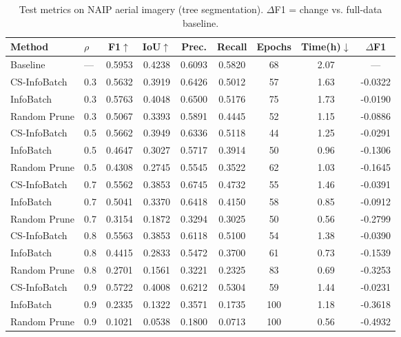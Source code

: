 \begin{table}[ht]
\centering
\small
\caption{Test metrics on NAIP aerial imagery (tree segmentation). $\Delta$F1 = change vs. full-data baseline.}
\label{tab:main_results}
\begin{tabular}{llccccccc}
\toprule
Method & $\rho$ & F1$\uparrow$ & IoU$\uparrow$ & Prec. & Recall & Epochs & Time(h)$\downarrow$ & $\Delta$F1 \\
\midrule
Baseline & --- & 0.5953 & 0.4238 & 0.6093 & 0.5820 & 68 & 2.07 & --- \\
\midrule
CS-InfoBatch & 0.3 & 0.5632 & 0.3919 & 0.6426 & 0.5012 & 57 & 1.63 & -0.0322 \\
InfoBatch & 0.3 & 0.5763 & 0.4048 & 0.6500 & 0.5176 & 75 & 1.73 & -0.0190 \\
Random Prune & 0.3 & 0.5067 & 0.3393 & 0.5891 & 0.4445 & 52 & 1.15 & -0.0886 \\
\midrule
CS-InfoBatch & 0.5 & 0.5662 & 0.3949 & 0.6336 & 0.5118 & 44 & 1.25 & -0.0291 \\
InfoBatch & 0.5 & 0.4647 & 0.3027 & 0.5717 & 0.3914 & 50 & 0.96 & -0.1306 \\
Random Prune & 0.5 & 0.4308 & 0.2745 & 0.5545 & 0.3522 & 62 & 1.03 & -0.1645 \\
\midrule
CS-InfoBatch & 0.7 & 0.5562 & 0.3853 & 0.6745 & 0.4732 & 55 & 1.46 & -0.0391 \\
InfoBatch & 0.7 & 0.5041 & 0.3370 & 0.6418 & 0.4150 & 58 & 0.85 & -0.0912 \\
Random Prune & 0.7 & 0.3154 & 0.1872 & 0.3294 & 0.3025 & 50 & 0.56 & -0.2799 \\
\midrule
CS-InfoBatch & 0.8 & 0.5563 & 0.3853 & 0.6118 & 0.5100 & 54 & 1.38 & -0.0390 \\
InfoBatch & 0.8 & 0.4415 & 0.2833 & 0.5472 & 0.3700 & 61 & 0.73 & -0.1539 \\
Random Prune & 0.8 & 0.2701 & 0.1561 & 0.3221 & 0.2325 & 83 & 0.69 & -0.3253 \\
\midrule
CS-InfoBatch & 0.9 & 0.5722 & 0.4008 & 0.6212 & 0.5304 & 59 & 1.44 & -0.0231 \\
InfoBatch & 0.9 & 0.2335 & 0.1322 & 0.3571 & 0.1735 & 100 & 1.18 & -0.3618 \\
Random Prune & 0.9 & 0.1021 & 0.0538 & 0.1800 & 0.0713 & 100 & 0.56 & -0.4932 \\
\bottomrule
\end{tabular}
\end{table}